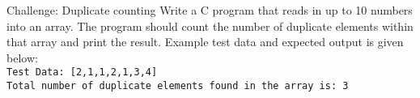 \documentclass{pass}
\begin{document}
\begin{task}{Challenge: Duplicate counting}{}
Write a C program that reads in up to 10 numbers into an array. The program should count the number of duplicate elements within that array and print the result. Example test data and expected output is given below:\\[12pt]
\texttt{Test Data: [2,1,1,2,1,3,4]\\}
\texttt{Total number of duplicate elements found in the array is: 3 }
\end{task}
\end{document}
